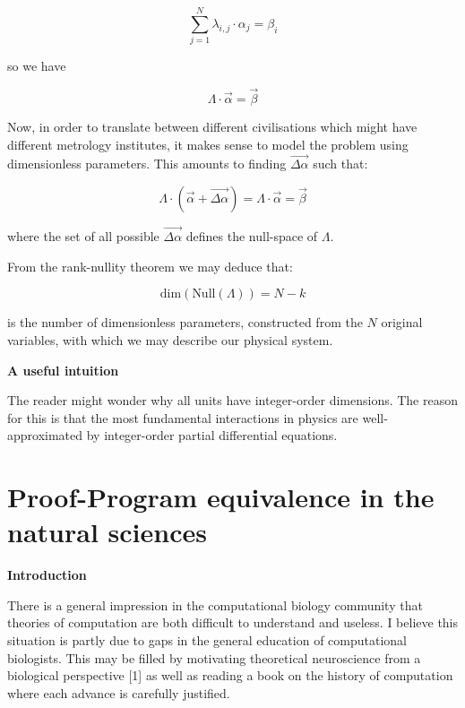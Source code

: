 \documentclass{article}
\begin{document}
\begin{equation}
\sum_{j=1}^N \lambda_{i,j} \cdot \alpha_j = \beta_i
\end{equation}

so we have

\begin{equation}
\Lambda \cdot \vec{\alpha} = \vec{\beta}
\end{equation}

Now, in order to translate between different civilisations which might have different metrology institutes, it makes
sense to model the problem using dimensionless parameters. This amounts to finding $\vec{\Delta \alpha}$ such that:

\begin{equation}
\Lambda \cdot (\vec{\alpha} + \vec{\Delta \alpha}) = \Lambda \cdot \vec{\alpha} = \vec{\beta}
\end{equation}

where the set of all possible $\vec{\Delta \alpha}$ defines the null-space of $\Lambda$.

From the rank-nullity theorem we may deduce that:

\begin{equation}
\textrm{dim}(\textrm{Null}(\Lambda)) = N-k
\end{equation}

is the number of dimensionless parameters, constructed from the $N$ original variables, with which we may describe our physical system.

\textbf{A useful intuition}

The reader might wonder why all units have integer-order dimensions. The reason for this
is that the most fundamental interactions in physics are well-approximated by integer-order
partial differential equations.


\newpage 

\section{Proof-Program equivalence in the natural sciences}

\textbf{Introduction}

There is a general impression in the computational biology community that theories of computation are both difficult to
understand and useless. I believe this situation is partly due to gaps in the general education of computational biologists.
This may be filled by motivating theoretical neuroscience from a biological perspective [1] as well as reading a book
on the history of computation where each advance is carefully justified.
\end{document}
